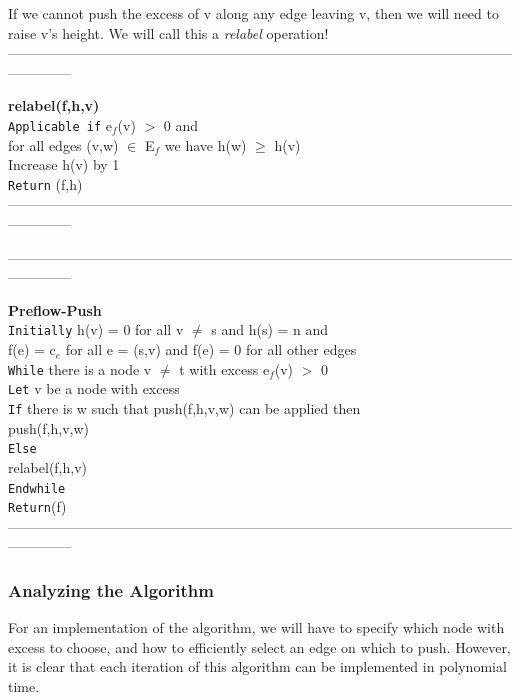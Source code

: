 \documentclass{article}
\begin{document}
If we cannot push the excess of v along any edge leaving v, then we will need to raise v's height. We will call this a \emph{relabel} operation!\\

\medskip
--------------------------------------------------------------------------------------------------------------------------
\medskip

\textbf{relabel(f,h,v)}\\
\texttt{Applicable if} e$_f$(v) $>$ 0 and\\
for all edges (v,w) $\in$ E$_f$ we have h(w) $\ge$ h(v)\\
Increase h(v) by 1\\
\texttt{Return} (f,h)\\

\medskip
--------------------------------------------------------------------------------------------------------------------------
\medskip

\medskip
--------------------------------------------------------------------------------------------------------------------------
\medskip

\textbf{Preflow-Push}\\
\texttt{Initially} h(v) = 0 for all v $\neq$ s and h(s) = n and\\
f(e) = c$_e$ for all e = (s,v) and f(e) = 0 for all other edges\\
\texttt{While} there is a node v $\neq$ t with excess e$_f$(v) $>$ 0\\
\texttt{Let} v be a node with excess\\
\texttt{If} there is w such that push(f,h,v,w) can be applied then\\
push(f,h,v,w)\\
\texttt{Else}\\
relabel(f,h,v)\\
\texttt{Endwhile}\\
\texttt{Return}(f)\\

\medskip
--------------------------------------------------------------------------------------------------------------------------
\medskip

\subsubsection{Analyzing the Algorithm}
For an implementation of the algorithm, we will have to specify which node with excess to choose, and how to efficiently select an edge on which to push. However, it is clear that each iteration of this algorithm can be implemented in polynomial time.\\
\end{document}
